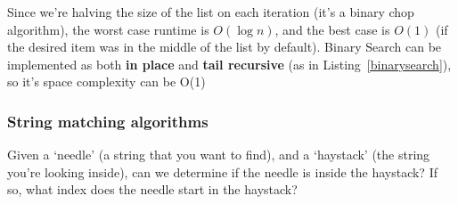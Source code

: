 
Since we're halving the size of the list on each iteration (it's a binary chop
algorithm), the worst case runtime is $O(\log n)$, and the best case is $O(1)$
(if the desired item was in the middle of the list by default). Binary Search
can be implemented as both \textbf{in place} and \textbf{tail recursive} (as in
Listing~\ref{binarysearch}), so it's space complexity can be O(1)

\subsubsection{String matching algorithms}

Given a `needle' (a string that you want to find), and a `haystack' (the string
you're looking inside), can we determine if the needle is inside the haystack?
If so, what index does the needle start in the haystack?

